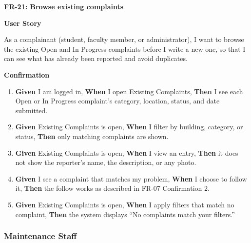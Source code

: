 \noindent\textbf{FR-21: Browse existing complaints}\par\nopagebreak[4]\smallskip
\noindent\textbf{User Story}\par\nopagebreak[4]
\noindent As a complainant (student, faculty member, or administrator), I want to browse the existing Open and In Progress complaints before I write a new one, so that I can see what has already been reported and avoid duplicates.\par\smallskip
{\makeatletter
{}
\makeatother
\noindent\textbf{Confirmation}\par\nopagebreak[4]\vspace{-6pt}\nopagebreak[4]
\begin{enumerate}\setlength{\itemsep}{2pt}\setlength{\parsep}{0pt}\setlength{\topsep}{2pt}\setlength{\partopsep}{0pt}
  \item \textbf{Given} I am logged in, \textbf{When} I open Existing Complaints, \textbf{Then} I see each Open or In Progress complaint's category, location, status, and date submitted.
  \item \textbf{Given} Existing Complaints is open, \textbf{When} I filter by building, category, or status, \textbf{Then} only matching complaints are shown.
  \item \textbf{Given} Existing Complaints is open, \textbf{When} I view an entry, \textbf{Then} it does not show the reporter's name, the description, or any photo.
  \item \textbf{Given} I see a complaint that matches my problem, \textbf{When} I choose to follow it, \textbf{Then} the follow works as described in FR-07 Confirmation 2.
  \item \textbf{Given} Existing Complaints is open, \textbf{When} I apply filters that match no complaint, \textbf{Then} the system displays ``No complaints match your filters.''
\end{enumerate}}
\medskip
 
\subsubsection*{Maintenance Staff}

